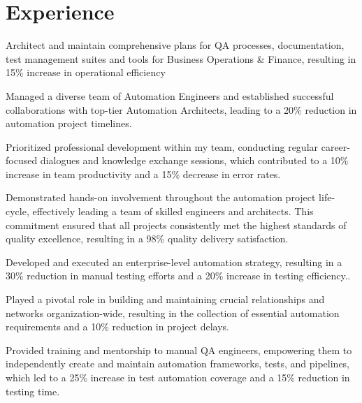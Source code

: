 \documentclass[]{deedy-resume-openfont}
\begin{document}
\begin{minipage}[t]{0.66\textwidth} 
\section{Experience}
\vspace{\topsep} %
\begin{tightemize}
\item Architect and maintain comprehensive plans for QA processes, documentation, test management suites and tools for Business Operations \& Finance, resulting in 15\% increase in operational efficiency
\item Managed a diverse team of Automation Engineers and established successful collaborations with top-tier Automation Architects, leading to a 20\% reduction in automation project timelines.
\item Prioritized professional development within my team, conducting regular career-focused dialogues and knowledge exchange sessions, which contributed to a 10\% increase in team productivity and a 15\% decrease in error rates.
\item Demonstrated hands-on involvement throughout the automation project life-cycle, effectively leading a team of skilled engineers and architects. This commitment ensured that all projects consistently met the highest standards of quality excellence, resulting in a 98\% quality delivery satisfaction.
\end{tightemize}
\vspace{\topsep} %
\begin{tightemize}
\item Developed and executed an enterprise-level automation strategy, resulting in a 30\% reduction in manual testing efforts and a 20\% increase in testing efficiency..
\item Played a pivotal role in building and maintaining crucial relationships and networks organization-wide, resulting in the collection of essential automation requirements and a 10\% reduction in project delays.
\item Provided training and mentorship to manual QA engineers, empowering them to independently create and maintain automation frameworks, tests, and pipelines, which led to a 25\% increase in test automation coverage and a 15\% reduction in testing time.

\end{tightemize}
\end{minipage}
\end{document}
